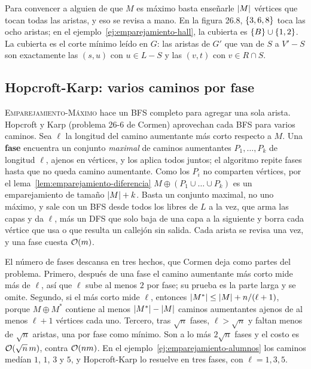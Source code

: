 \documentclass[11pt,letterpaper]{article}
\begin{document}
Para convencer a alguien de que $M$ es máximo basta enseñarle
$\left\lvert M \right\rvert$ vértices que tocan todas las aristas, y eso se revisa a
mano. En la figura 26.8, $\left\{ 3, 6, 8 \right\}$ toca las ocho aristas; en el
ejemplo~\ref{ej:emparejamiento-hall}, la cubierta es
$\left\{ B \right\} \cup \left\{ 1, 2 \right\}$. La cubierta es el corte mínimo leído en
$G$: las aristas de $G'$ que van de $S$ a $V' - S$ son exactamente
las $(s, u)$ con $u \in L - S$ y las $(v, t)$ con $v \in R \cap S$.


\subsection*{Hopcroft-Karp: varios caminos por fase}

\textsc{Emparejamiento-Máximo} hace un BFS completo para agregar una
sola arista. Hopcroft y Karp (problema 26-6 de Cormen) aprovechan
cada BFS para varios caminos. Sea $\ell$ la longitud del camino
aumentante más corto respecto a $M$. Una \textbf{fase} encuentra un
conjunto \emph{maximal} de caminos aumentantes $P_1, \dots, P_k$ de
longitud $\ell$, ajenos en vértices, y los aplica todos juntos; el
algoritmo repite fases hasta que no queda camino aumentante. Como los
$P_i$ no comparten vértices, por el
lema~\ref{lem:emparejamiento-diferencia}
$M \oplus (P_1 \cup \dots \cup P_k)$ es un emparejamiento de tamaño
$\left\lvert M \right\rvert + k$. Basta un conjunto maximal, no uno máximo, y sale con
un BFS desde todos los libres de $L$ a la vez, que arma las capas y
da $\ell$, más un DFS que solo baja de una capa a la siguiente y
borra cada vértice que usa o que resulta un callejón sin salida. Cada
arista se revisa una vez, y una fase cuesta $\mathcal{O}\!\left(m\right)$.

El número de fases descansa en tres hechos, que Cormen deja como
partes del problema. Primero, después de una fase el camino
aumentante más corto mide más de $\ell$, así que $\ell$ sube al menos
$2$ por fase; su prueba es la parte larga y se omite. Segundo, si el
más corto mide $\ell$, entonces $\left\lvert M^* \right\rvert \le \left\lvert M \right\rvert + n/(\ell + 1)$,
porque $M \oplus M^*$ contiene al menos $\left\lvert M^* \right\rvert - \left\lvert M \right\rvert$ caminos
aumentantes ajenos de al menos $\ell + 1$ vértices cada uno. Tercero,
tras $\sqrt{n}$ fases, $\ell > \sqrt{n}$ y faltan menos de $\sqrt{n}$
aristas, una por fase como mínimo. Son a lo más $2\sqrt{n}$ fases y
el costo es $\mathcal{O}\!\left(\sqrt{n}\, m\right)$, contra $\mathcal{O}\!\left(nm\right)$. En el
ejemplo~\ref{ej:emparejamiento-alumnos} los caminos medían $1$, $1$,
$3$ y $5$, y Hopcroft-Karp lo resuelve en tres fases, con
$\ell = 1, 3, 5$.
\end{document}
